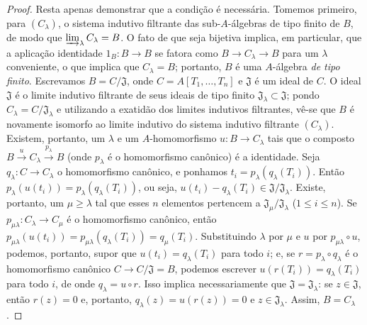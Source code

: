 \begin{proof}
Resta apenas demonstrar que a condição é necessária.
Tomemos primeiro, para $(C_\lambda)$, o sistema indutivo filtrante das sub-$A$-álgebras de tipo finito de $B$, de modo que $\varinjlim_\lambda C_\lambda=B$.
O fato de que  seja bijetiva implica, em particular, que a aplicação identidade $1_B:B\to B$ se fatora como $B\to C_\lambda\to B$ para um $\lambda$ conveniente, o que implica que $C_\lambda=B$; portanto, $B$ é uma $A$-álgebra \emph{de tipo finito}.
Escrevamos $B=C/\mathfrak{J}$, onde $C=A[T_1,\ldots,T_n]$ e $\mathfrak{J}$ é um ideal de $C$. O ideal $\mathfrak{J}$ é o limite indutivo filtrante de seus ideais de tipo finito $\mathfrak{J}_\lambda\subset\mathfrak{J}$; pondo $C_\lambda=C/\mathfrak{J}_\lambda$ e utilizando a exatidão dos limites indutivos filtrantes, vê-se que $B$ é novamente isomorfo ao limite indutivo do sistema indutivo filtrante $(C_\lambda)$.
Existem, portanto, um $\lambda$ e um $A$-homomorfismo $u:B\to C_\lambda$ tais que o composto $B\xrightarrow{u}C_\lambda\xrightarrow{p_\lambda}B$ (onde $p_\lambda$ é o homomorfismo canônico) é a identidade.
Seja $q_\lambda:C\to C_\lambda$ o homomorfismo canônico, e ponhamos
$t_i=p_\lambda(q_\lambda(T_i))$.
Então $p_\lambda(u(t_i))=p_\lambda(q_\lambda(T_i))$, ou seja,
$u(t_i)-q_\lambda(T_i)\in\mathfrak{J}/\mathfrak{J}_\lambda$.
Existe, portanto, um $\mu\geqslant\lambda$ tal que esses $n$ elementos pertencem a
$\mathfrak{J}_\mu/\mathfrak{J}_\lambda$ ($1\leqslant i\leqslant n$).
Se $p_{\mu\lambda}:C_\lambda\to C_\mu$ é o homomorfismo canônico, então
$p_{\mu\lambda}(u(t_i))=p_{\mu\lambda}(q_\lambda(T_i))=q_\mu(T_i)$.
Substituindo $\lambda$ por $\mu$ e $u$ por $p_{\mu\lambda}\circ u$, podemos, portanto,
supor que $u(t_i)=q_\lambda(T_i)$ para todo $i$; e, se
$r=p_\lambda\circ q_\lambda$ é o homomorfismo canônico
$C\to C/\mathfrak{J}=B$, podemos escrever $u(r(T_i))=q_\lambda(T_i)$ para todo $i$,
de onde $q_\lambda=u\circ r$.
Isso implica necessariamente que $\mathfrak{J}=\mathfrak{J}_\lambda$: se $z\in\mathfrak{J}$, então $r(z)=0$ e, portanto, $q_\lambda(z)=u(r(z))=0$ e $z\in\mathfrak{J}_\lambda$. Assim, $B=C_\lambda$.


\end{proof}
